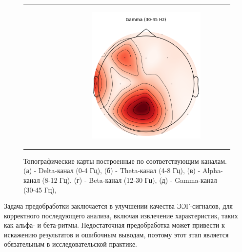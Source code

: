\begin{figure}[!ht]
\begin{tabular}{ccc}
\begin{subfigure}[c]{0.3\textwidth}
            \caption{}
        \end{subfigure}
        &
        \begin{subfigure}[c]{0.3\textwidth}
            \centering
            \includegraphics{images/topomap_gamma_colored.png}
            \caption{}
        \end{subfigure}
    \end{tabular}
    \caption{Топографические карты построенные по соответствующим каналам. (а) - Delta-канал (0-4 Гц), (б) - Theta-канал (4-8 Гц), (в) - Alpha-канал (8-12 Гц), (г) - Beta-канал (12-30 Гц), (д) - Gamma-канал (30-45 Гц),}
    \label{fig:topomap_colored}
\end{figure}

Задача предобработки заключается в улучшении качества ЭЭГ-сигналов, для корректного последующего анализа, включая извлечение характеристик, таких как альфа- и бета-ритмы. Недостаточная предобработка может привести к искажению результатов и ошибочным выводам, поэтому этот этап является обязательным в исследовательской практике.

\endinput